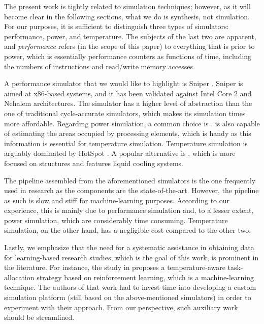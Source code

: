 The present work is tightly related to simulation techniques; however, as it
will become clear in the following sections, what we do is synthesis, not
simulation. For our purposes, it is sufficient to distinguish three types of
simulators: performance, power, and temperature. The subjects of the last two
are apparent, and \emph{performance} refers (in the scope of this paper) to
everything that is prior to power, which is essentially performance counters as
functions of time, including the numbers of instructions and read/write memory
accesses.

A performance simulator that we would like to highlight is Sniper
\cite{carlson2011}. Sniper is aimed at x86-based systems, and it has been
validated against Intel Core 2 and Nehalem architectures. The simulator has a
higher level of abstraction than the one of traditional cycle-accurate
simulators, which makes its simulation times more affordable. Regarding power
simulation, a common choice is  \cite{li2009}.  is also
capable of estimating the areas occupied by processing elements, which is handy
as this information is essential for temperature simulation. Temperature
simulation is arguably dominated by HotSpot \cite{skadron2004}. A popular
alternative is  \cite{sridhar2010}, which is more focused on 
structures and features liquid cooling systems.

The pipeline assembled from the aforementioned simulators is the one frequently
used in research as the components are the state-of-the-art. However, the
pipeline as such is slow and stiff for machine-learning purposes. According to
our experience, this is mainly due to performance simulation and, to a lesser
extent, power simulation, which are considerably time consuming. Temperature
simulation, on the other hand, has a negligible cost compared to the other two.

Lastly, we emphasize that the need for a systematic assistance in obtaining data
for learning-based research studies, which is the goal of this work, is
prominent in the literature. For instance, the study in \cite{lu2015} proposes a
temperature-aware task-allocation strategy based on reinforcement learning,
which is a machine-learning technique. The authors of that work had to invest
time into developing a custom simulation platform (still based on the
above-mentioned simulators) in order to experiment with their approach. From our
perspective, such auxiliary work should be streamlined.
